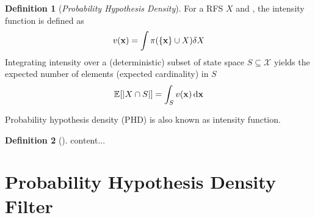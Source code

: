 \documentclass[a4paper,10pt]{scrreprt}
\theoremstyle{theorem}
\theoremstyle{definition}
\newtheorem{defn}{Definition}
\begin{document}
\begin{defn}[\emph{Probability Hypothesis Density}]
	For a RFS \( X \) and , the intensity function is defined as
	\begin{equation}\label{key}
		v(\stVar) = \int \pi(\Bqty{\stVar} \cup X) \dsx[X]
	\end{equation}
	Integrating intensity over a (deterministic) subset of state space \( S \subseteq \mathcal{X} \) yields the expected number of elements (expected cardinality) in \( S \)
	\begin{equation}\label{key}
		\E{|X \cap S|} = \int_S v(\stVar) \dx[\stVar]
	\end{equation}
\end{defn}
Probability hypothesis density (PHD) is also known as intensity function.

\begin{defn}[]
	content...
\end{defn}



\section{Probability Hypothesis Density Filter}





\end{document}
